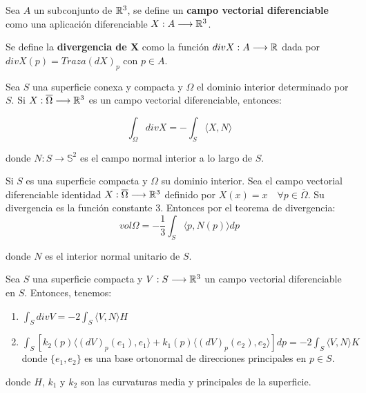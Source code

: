 \begin{definition}
Sea $A$ un subconjunto de $\mathbb{R}^3$, se define un \textbf{campo vectorial diferenciable} como una aplicación diferenciable $X: A \longrightarrow \mathbb{R}^3$.
\end{definition}

\begin{definition}
Se define la \textbf{divergencia de X} como la función $div X: A \longrightarrow \mathbb{R}$ dada por $divX(p) = Traza(dX)_p$ con $p \in A$.
\end{definition}

\begin{theorem}\label{divergencetheorem}
Sea $S$ una superficie conexa y compacta y $\Omega$ el dominio interior determinado por $S$. Si $X: \overline{\Omega} \longrightarrow \mathbb{R}^3$ es un campo vectorial diferenciable, entonces:

\begin{equation*}
    \int_\Omega div X = -\int_S  \langle X,N \rangle
\end{equation*}

donde $N: S \longrightarrow \mathbb{S}^2$ es el campo normal interior a lo largo de $S$.
\end{theorem}

\begin{definition}\label{volumensuperficiecompacta}
Si $S$ es una superficie compacta y $\Omega$ su dominio interior. Sea el campo vectorial diferenciable identidad $X: \overline{\Omega} \longrightarrow \mathbb{R}^3$ definido por $X(x) = x \quad \forall p \in \overline{\Omega}$. Su divergencia es la función constante 3. Entonces por el teorema de divergencia:
\begin{equation*}
    vol \Omega = - \frac{1}{3} \int_S  \langle p, N(p) \rangle  dp
\end{equation*}

donde $N$ es el interior normal unitario de $S$.
\end{definition}

\begin{theorem}\label{divergesurfaces}
Sea $S$ una superficie compacta y $V: S \longrightarrow \mathbb{R}^3$ un campo vectorial diferenciable en $S$. Entonces, tenemos:

\begin{enumerate}
    \item $\int_S div V = -2 \int_S \langle V,N \rangle H$
    \item $\int_S [k_2(p) \langle (dV)_p(e_1),e_1 \rangle  + k_1(p) \langle (dV)_p(e_2),e_2 \rangle ]dp = -2 \int_S \langle V,N \rangle K$ donde $\{e_1,e_2\}$ es una base ortonormal de direcciones principales en $p \in S$.
\end{enumerate}

donde $H$, $k_1$ y $k_2$ son las curvaturas media y principales de la superficie.
\end{theorem}

